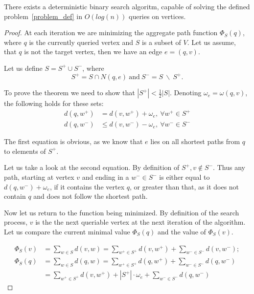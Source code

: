 \begin{theorem}
There exists a deterministic binary search algoritm, capable of solving the defined problem~\ref{problem_def} in $O(log(n))$ queries on vertices.
\end{theorem}
\begin{proof}
	At each iteration we are minimizing the aggregate path function $\Phi_S(q)$, where $q$ is the currently queried vertex and $S$ is a subset of $V$.
	Let us assume, that $q$ is not the target vertex, then we have an edge $e = (q, v)$.


	Let us define $S = S^+ \cup S^-$, where
		\[S^+ = S \cap N(q, e)~\text{and}~S^- = S~\backslash~S^+.\]


	To prove the theorem we need to show that $|S^+| < \frac{1}{2}|S|$. Denoting $\omega_e = \omega(q, v)$, the following holds for these sets:
	\begin{align*}
	d(q, w^+) &= d(v, w^+) + \omega_e,~\forall w^+ \in S^+
	\\
	d(q, w^-) &\le d(v, w^-) - \omega_e,~\forall w^- \in S^-
	\end{align*}


	The first equation is obvious, as we know that $e$ lies on all shortest paths from $q$ to elements of $S^+$.


	Let us take a look at the second equation. By definition of $S^+, v \notin S^-$. Thus any path, starting at vertex $v$ and ending in a $w^- \in S^-$ is either equal to $d(q, w^-) + \omega_e$, if it contains the vertex $q$, or greater than that, as it does not contain $q$ and does not follow the shortest path.


	Now let us return to the function being minimized. By definition of the search process, $v$ is the the next queriable vertex at the next iteration of the algorithm. Let us compare the current minimal value $\Phi_S(q)$ and the value of $\Phi_S(v)$.


	\begin{align*}
	\Phi_S(v) &= \sum \limits_{w \in S} d(v, w) = \sum \limits_{w^+ \in S^+} d(v, w^+) + \sum \limits_{w^- \in S^-} d(v, w^-);
	\\
	\Phi_S(q) &= \sum \limits_{w \in S} d(q, w) = \sum \limits_{w^+ \in S^+} d(q, w^+) + \sum \limits_{w^- \in S^-} d(q, w^-) \\
	          &                                 = \sum \limits_{w^+ \in S^+} d(v, w^+) + |S^+| \cdot \omega_e + \sum \limits_{w^- \in S^-} d(q, w^-)
	\end{align*}



\end{proof}
